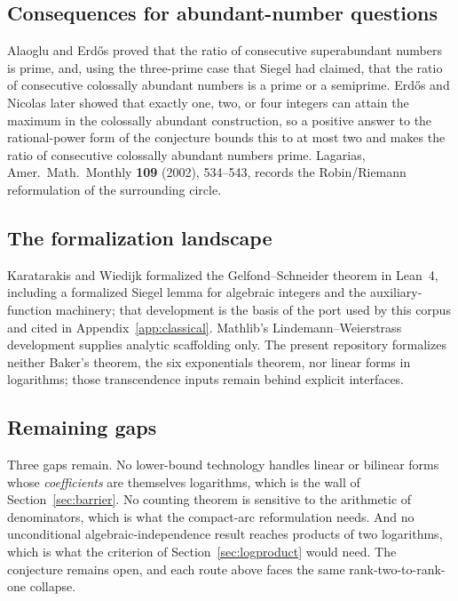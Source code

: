 \documentclass[11pt,oneside]{article}
\theoremstyle{definition}
\theoremstyle{remark}
\begin{document}
\subsection{Consequences for abundant-number questions}

Alaoglu and Erd\H{o}s proved that the ratio of consecutive superabundant numbers is prime, and,
using the three-prime case that Siegel had claimed, that the ratio of consecutive colossally
abundant numbers is a prime or a semiprime.  Erd\H{o}s and Nicolas later showed that exactly
one, two, or four integers can attain the maximum in the colossally abundant construction, so a
positive answer to the rational-power form of the conjecture bounds this to at most two and
makes the ratio of consecutive colossally abundant numbers prime.  Lagarias, Amer.\ Math.\
Monthly \textbf{109} (2002), 534--543, records the Robin/Riemann reformulation of the
surrounding circle.

\subsection{The formalization landscape}

Karatarakis and Wiedijk formalized the Gelfond--Schneider theorem in Lean~4, including a
formalized Siegel lemma for algebraic integers and the auxiliary-function machinery; that
development is the basis of the port used by this corpus and cited in
Appendix~\ref{app:classical}.  Mathlib's Lindemann--Weierstrass development supplies analytic
scaffolding only.  The present repository formalizes neither Baker's theorem, the six
exponentials theorem, nor linear forms in logarithms; those transcendence inputs remain behind
explicit interfaces.

\subsection{Remaining gaps}

Three gaps remain.  No lower-bound technology handles
linear or bilinear forms whose \emph{coefficients} are themselves logarithms, which is the wall
of Section~\ref{sec:barrier}.  No counting theorem is sensitive to the arithmetic of
denominators, which is what the compact-arc reformulation needs.  And no unconditional
algebraic-independence result reaches products of two logarithms, which is what the criterion
of Section~\ref{sec:logproduct} would need.  The conjecture remains open, and each route above
faces the same rank-two-to-rank-one collapse.
\end{document}
